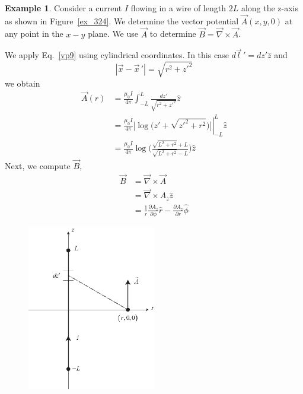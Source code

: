 \documentclass[11pt,a4paper,oneside]{book}
\numberwithin{equation}{section}
\newcommand{\abs}[1]{\left|#1\right|}
\theoremstyle{it}
\theoremstyle{definition}
\newtheorem{example}{Example}[section]
\begin{document}
\begin{example}
Consider a current $I$ flowing in a wire of length $2L$ along the z-axis as shown in Figure~\ref{ex_324}. We determine the vector potential $\vec{A}(x,y,0)$ at any point in the $x-y$ plane. We use $\vec{A}$ to determine $\vec{B}=\vec{\nabla}\times\vec{A}$.

We apply Eq.~\eqref{vp9} using cylindrical coordinates. In this case $d\vec{l}\,'=dz'\hat{z}$ and
\begin{equation*}\label{}
	\abs{\vec{x}-\vec{x}\,'}=\sqrt{r^2+{z'}^2}
\end{equation*}
we obtain
\begin{equation}\label{ex_324_1}
\begin{aligned}
	\vec{A}(r) &= \frac{\mu_0I}{4\pi}\int_{-L}^{L}\frac{dz'}{\sqrt{r^2+{z'}^2}}\hat{z} \\[6pt]
	&= \frac{\mu_0I}{4\pi} \left.\Big[\log\big(z'+\sqrt{{z'}^2+r^2}\big)\Big]\right|^L_{-L}\hat{z}  \\[6pt]
	&= \frac{\mu_0I}{4\pi} \log\Big(\frac{\sqrt{L^2+r^2}+L}{\sqrt{L^2+r^2}-L}\Big)\hat{z} 
\end{aligned}
\end{equation}
Next, we compute $\vec{B}$,
\begin{equation}\label{ex_324_2}
	\begin{aligned}
		\vec{B}&=\vec{\nabla}\times\vec{A} \\[6pt]
		&= \vec{\nabla}\times A_z\hat{z} \\[6pt]
		&= \frac{1}{r}\frac{\partial A_z}{\partial \phi}\hat{r}-\frac{\partial A_z}{\partial r}\hat{\phi}
	\end{aligned}
\end{equation}
\begin{figure}[H] 
\centering
\includegraphics[width = 0.5\textwidth, width = 250pt, angle = 0, keepaspectratio]{figures/example_324.eps}

\end{figure}
\end{example}
\end{document}
